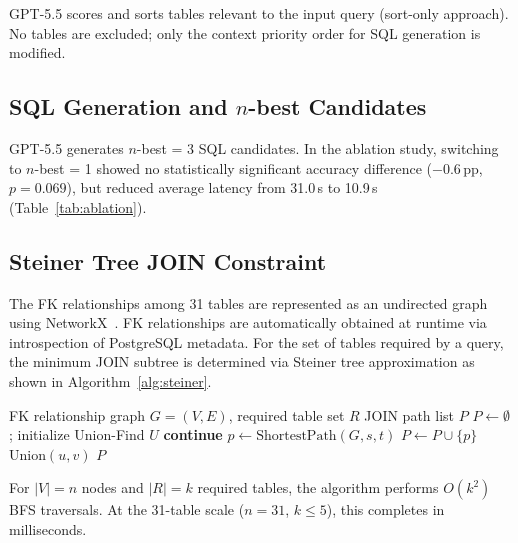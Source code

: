 \documentclass{npj-compt.mater}
\begin{document}
GPT-5.5 scores and sorts tables relevant to the input query
(sort-only approach).
No tables are excluded; only the context priority order
for SQL generation is modified.

\subsection{SQL Generation and $n$-best Candidates}

GPT-5.5 generates $n$-best = 3 SQL candidates.
In the ablation study, switching to $n$-best = 1 showed
no statistically significant accuracy difference ($-$0.6\,pp, $p=0.069$),
but reduced average latency from 31.0\,s to 10.9\,s
(Table~\ref{tab:ablation}).

\subsection{Steiner Tree JOIN Constraint}
\label{sec:schema_graph}

The FK relationships among 31 tables are represented as an undirected graph
using NetworkX~\cite{networkx2008}.
FK relationships are automatically obtained at runtime via introspection
of PostgreSQL metadata.
For the set of tables required by a query,
the minimum JOIN subtree is determined via Steiner tree approximation
as shown in Algorithm~\ref{alg:steiner}.

\begin{algorithm}[htbp]
  \caption{Minimum covering JOIN subgraph (Steiner tree approximation).}
  \label{alg:steiner}
  \begin{algorithmic}[1]
    \Require FK relationship graph $G = (V, E)$, required table set $R$
    \Ensure JOIN path list $P$
    \State $P \gets \emptyset$; initialize Union-Find $U$
        \State \textbf{continue}
      \EndIf
      \State $p \gets \text{ShortestPath}(G, s, t)$ 
        \State $P \gets P \cup \{p\}$
          \State $\text{Union}(u, v)$
        \EndFor
      \EndIf
    \EndFor
    \State \Return $P$
  \end{algorithmic}
\end{algorithm}

For $|V| = n$ nodes and $|R| = k$ required tables,
the algorithm performs $O(k^2)$ BFS traversals.
At the 31-table scale ($n = 31$, $k \leq 5$), this completes in milliseconds.
\end{document}
